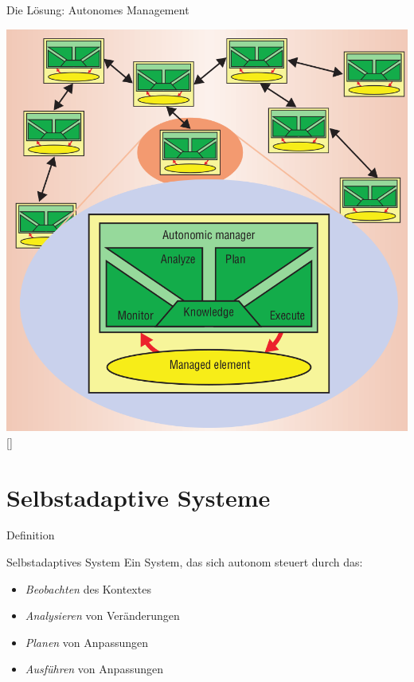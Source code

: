 \documentclass[de,16:9]{sdqbeamer}
\begin{document}
\begin{frame}{Die Lösung: Autonomes Management}
	\begin{center}
		\includegraphics[height=0.7\textheight]{sources/MAPEK.png}
		[\cite{VisionOfAutonomicComputing}]
	\end{center}
\end{frame}

\section{Selbstadaptive Systeme}

\begin{frame}{Definition}
	\begin{greenblock}{Selbstadaptives System}
		Ein System, das sich autonom steuert durch das:
		\begin{itemize}
			\item \textit{Beobachten} des Kontextes
			\item \textit{Analysieren} von Veränderungen
			\item \textit{Planen} von Anpassungen
			\item \textit{Ausführen} von Anpassungen
		\end{itemize}
	\end{greenblock}
\end{frame}
\end{document}
